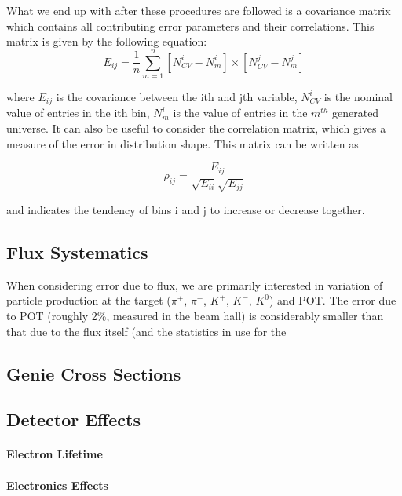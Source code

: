 \documentclass[12pt]{article}
\begin{document}
\par What we end up with after these procedures are followed is a covariance matrix which contains all contributing error parameters and their correlations.  This matrix is given by the following equation:
\begin{equation}
\label{eq:cov_matrix}
E_{ij} = \frac{1}{n} \sum_{m=1}^{n} [N_{CV}^i - N_{m}^i] \times [N_{CV}^j - N_{m}^j] 
\end{equation}

where $E_{ij}$ is the covariance between the ith and jth variable, $N_{CV}^i$ is the nominal value of entries in the ith bin, $N_{m}^i$ is the value of entries in the $m^{th}$ generated universe.  It can also be useful to consider the correlation matrix, which gives a measure of the error in distribution shape.  This matrix can be written as 

\begin{equation}
\label{eq:cov_matrix}
\rho_{ij} = \frac{E_{ij}}{\sqrt{E_{ii}} \sqrt{E_{jj}}}
\end{equation}

\noindent and indicates the tendency of bins i and j to increase or decrease together.


\subsection{Flux Systematics}
When considering error due to flux, we are primarily interested in variation of particle production at the target ($\pi^+$, $\pi^-$, $K^+$, $K^-$, $K^0$) and POT.  The error due to POT (roughly 2\%, measured in the beam hall) is considerably smaller than that due to the flux itself (and the statistics in use for the  


\subsection{Genie Cross Sections}
\subsection{Detector Effects}
\paragraph{Electron Lifetime}
\paragraph{Electronics Effects}
\end{document}
